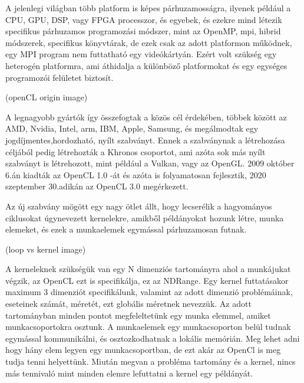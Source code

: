 

A jelenlegi világban több platform is képes párhuzamosságra, ilyenek például a CPU, GPU, DSP, vagy FPGA processzor, és egyebek, és ezekre mind létezik specifikus párhuzamos programozási módszer, mint az OpenMP, mpi, hibrid módszerek, specifikus könyvtárak, de ezek csak az adott platformon működnek, egy MPI program nem futtatható egy videókártyán. Ezért volt szükség egy heterogén platformra, ami áthidalja a különböző platformokat és egy egységes programozói felületet biztosít. 

\vspace{\baselineskip}

(openCL origin image)

\vspace{\baselineskip}

A legnagyobb gyártók így összefogtak a közös cél érdekében, többek között az AMD, Nvidia, Intel, arm, IBM, Apple, Samsung, és megálmodtak egy jogdíjmentes,hordozható, nyílt szabványt. Ennek a szabványnak a létrehozása céljából pedig létrehozták a Khronos csoportot, ami azóta sok más nyílt szabványt is létrehozott, mint például a Vulkan, vagy az OpenGL. 2009 október 6.án kiadták az OpenCL 1.0 -át és azóta is folyamatosan fejlesztik, 2020 szeptember 30.adikán az OpenCL 3.0 megérkezett.

Az új szabvány mögött egy nagy ötlet állt, hogy lecserélik a hagyományos ciklusokat úgynevezett kernelekre, amikből példányokat hozunk létre, munka elemeket, és ezek a munkaelemek egymással párhuzamosan futnak.

\vspace{\baselineskip}

(loop vs kernel image)

\vspace{\baselineskip}

 A kerneleknek szükségük van egy N dimenziós tartományra ahol a munkájukat végzik, az OpenCL  ezt is specifikálja, ez az NDRange. Egy kernel futtatásakor maximum 3 dimenziót specifikálunk, valamint az adott dimenzió problémáinak, eseteinek számát, méretét, ezt globális méretnek nevezzük. Az adott tartományban minden pontot megfeleltetünk egy munka elemmel, amiket munkacsoportokra osztunk. A munkaelemek egy munkacsoporton belül tudnak egymással kommunikálni, és osztozkodhatnak a lokális memórián. Meg lehet adni hogy hány elem legyen egy munkacsoportban, de ezt akár az OpenCl is meg tudja tenni helyettünk. Miután megvan a probléma tartomány és a  kernel, nincs más tennivaló mint minden elemre lefuttatni a kernel egy példányát.
\vspace{\baselineskip}

